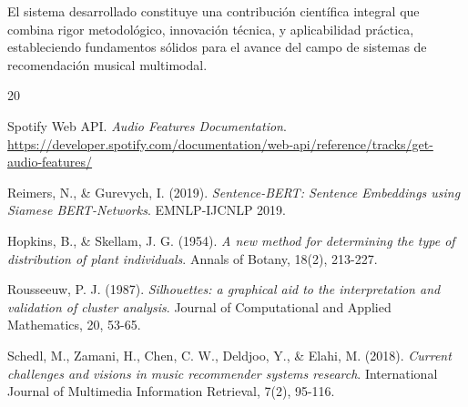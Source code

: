 \documentclass[12pt,a4paper]{report}
\begin{document}
El sistema desarrollado constituye una contribución científica integral que combina rigor metodológico, innovación técnica, y aplicabilidad práctica, estableciendo fundamentos sólidos para el avance del campo de sistemas de recomendación musical multimodal.

\begin{thebibliography}{20}

Spotify Web API. \textit{Audio Features Documentation}.
\url{https://developer.spotify.com/documentation/web-api/reference/tracks/get-audio-features/}

Reimers, N., \& Gurevych, I. (2019).
\textit{Sentence-BERT: Sentence Embeddings using Siamese BERT-Networks}.
EMNLP-IJCNLP 2019.

Hopkins, B., \& Skellam, J. G. (1954).
\textit{A new method for determining the type of distribution of plant individuals}.
Annals of Botany, 18(2), 213-227.

Rousseeuw, P. J. (1987).
\textit{Silhouettes: a graphical aid to the interpretation and validation of cluster analysis}.
Journal of Computational and Applied Mathematics, 20, 53-65.

Schedl, M., Zamani, H., Chen, C. W., Deldjoo, Y., \& Elahi, M. (2018).
\textit{Current challenges and visions in music recommender systems research}.
International Journal of Multimedia Information Retrieval, 7(2), 95-116.

\end{thebibliography}
\end{document}
